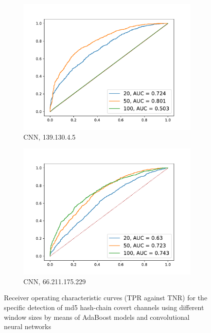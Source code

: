 \documentclass[12pt,a4paper,automark, toc=bib]{scrreprt}
\theoremstyle{definition}
\begin{document}
\begin{figure}
\begin{subfigure}{0.32\linewidth}
					\includegraphics[width=\linewidth]{figures/md5_139.130.4.5_keras.pdf}
					\caption{CNN, 139.130.4.5}
				\end{subfigure}
				\begin{subfigure}{0.32\linewidth}
				\centering
				\includegraphics[width=\linewidth]{figures/md5_66.211.175.229_keras.pdf}
				\caption{CNN, 66.211.175.229}
				\end{subfigure}
			\begin{subfigure}{0.32\linewidth}
				\hphantom{a}
			\end{subfigure}
				\caption{Receiver operating characteristic curves (TPR against TNR) for the specific  detection of md5 hash-chain covert channels using different window sizes by means of AdaBoost models and convolutional neural networks}
				\label{window-roc}
			\end{figure}
\end{document}
